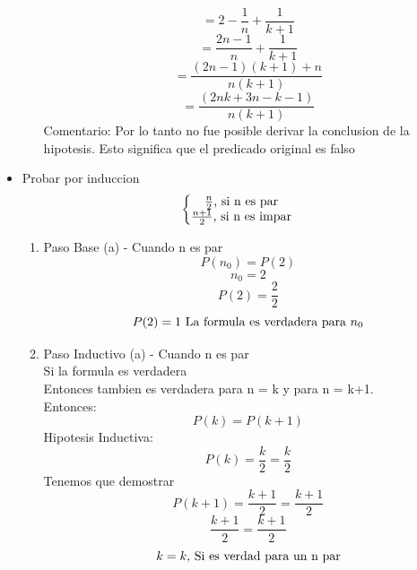 \documentclass[10pt,a4paper]{article}
\begin{document}
\begin{itemize}
\begin{enumerate}
\begin{equation*}
						 = 2- \frac{1}{n} + \frac{1}{k+1}
					\end{equation*}
					\begin{equation*}
						 = \frac{2n - 1}{n} + \frac{1}{k+1}
					\end{equation*}
					\begin{equation*}
						 = \frac{(2n-1)(k+1)+n}{n(k+1)}
					\end{equation*}
					\begin{equation*}
						 = \frac{(2nk+3n-k-1)}{n(k+1)}
					\end{equation*}
					Comentario: Por lo tanto no fue posible derivar la conclusion de la hipotesis. Esto significa que el predicado original es falso
			\end{enumerate}
			
		\item Probar por induccion
			\begin{equation*}
				[\frac{n}{2}]\left\{\begin{matrix}
				\frac{n}{2} \textup{, si n es par}\\ 
 				\frac{n+1}{2} \textup{, si n es impar}
				\end{matrix}\right.
			\end{equation*}
			\begin{enumerate}
				\item Paso Base (a) - Cuando n es par
					\begin{equation*}
						P(n_{0}) = P(2)
					\end{equation*}
					\begin{equation*}
						n_{0} = 2
					\end{equation*}
					\begin{equation*}
						P(2) = \frac{2}{2}
					\end{equation*}
					\begin{equation*}
						P(2) = 1  \textup{ La formula es verdadera para } n_{0}
					\end{equation*}
				\item Paso Inductivo (a)  - Cuando n es par\\
					Si la formula es verdadera\\
					Entonces tambien es verdadera para n = k y para n = k+1. \\
					Entonces:
					\begin{equation*}
						P(k) = P(k+1)
					\end{equation*}
					Hipotesis Inductiva:
					\begin{equation*}
						P(k) = \frac{k}{2} = \frac{k}{2}
					\end{equation*}
					Tenemos que demostrar 
					\begin{equation*}
						P(k+1) = \frac{k+1}{2} = \frac{k+1}{2}
					\end{equation*}
					\begin{equation*}
						\frac{k+1}{2} = \frac{k+1}{2}
					\end{equation*}
					\begin{equation*}
						k = k \textup{, Si es verdad para un n par}
					\end{equation*}
					

\end{enumerate}
\end{itemize}
\end{document}
